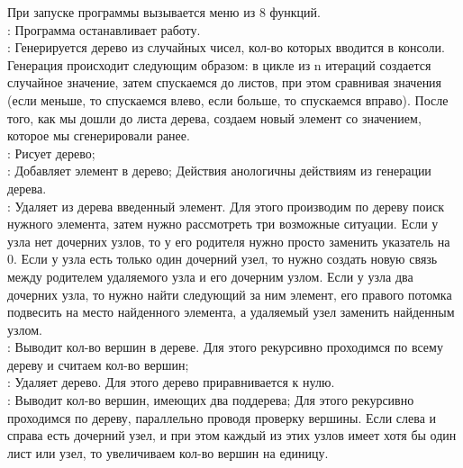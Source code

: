\begin{spacing}{1}

\indent При запуске программы вызывается меню из 8 функций.\\
: Программа останавливает работу.\\
: Генерируется дерево из случайных чисел, кол-во которых вводится в консоли. 
Генерация происходит следующим образом: в цикле из n итераций создается случайное значение, затем 
спускаемся до листов, при этом сравнивая значения (если меньше, то спускаемся влево, если больше, 
то спускаемся вправо). После того, как мы дошли до листа дерева, 
создаем новый элемент со значением, которое мы сгенерировали ранее.\\
: Рисует дерево;\\
: Добавляет элемент в дерево; Действия анологичны действиям из генерации дерева.\\
: Удаляет из дерева введенный элемент. Для этого производим по дереву поиск нужного элемента,
затем нужно рассмотреть три возможные ситуации. Если у узла нет дочерних узлов, 
то у его родителя нужно просто заменить указатель на 0. Если у узла есть только один дочерний узел, 
то нужно создать новую связь между родителем удаляемого узла и его дочерним узлом. Если у узла два дочерних узла, 
то нужно найти следующий за ним элемент, его правого потомка подвесить на место найденного элемента, 
а удаляемый узел заменить найденным узлом.\\
: Выводит кол-во вершин в дереве. Для этого рекурсивно проходимся по всему дереву и считаем кол-во вершин;\\
: Удаляет дерево. Для этого дерево приравнивается к нулю.\\
: Выводит кол-во вершин, имеющих два поддерева; Для этого рекурсивно проходимся по дереву, 
параллельно проводя проверку вершины. Если слева и справа есть дочерний узел, и при этом каждый из этих узлов 
имеет хотя бы один лист или узел, то увеличиваем кол-во вершин на единицу.\\

\end{spacing}
